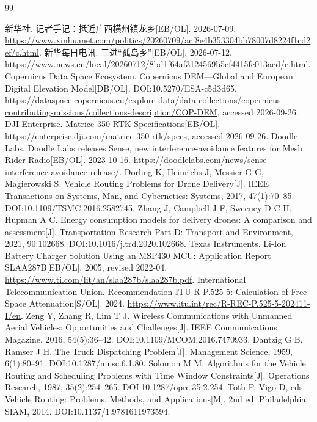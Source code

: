 \begin{thebibliography}{99}
\raggedright
{} 新华社. 记者手记：抵近广西横州镇龙乡[EB/OL]. 2026-07-09. \url{https://www.xinhuanet.com/politics/20260709/acf8e4b353304bb78007d8224f1cd2ef/c.html}.
 新华每日电讯. 三进“孤岛乡”[EB/OL]. 2026-07-12. \url{https://www.news.cn/local/20260712/8bd1f64af3124569b5cf4415fc013acd/c.html}.
 Copernicus Data Space Ecosystem. Copernicus DEM—Global and European Digital Elevation Model[DB/OL]. DOI:10.5270/ESA-c5d3d65. \url{https://dataspace.copernicus.eu/explore-data/data-collections/copernicus-contributing-missions/collections-description/COP-DEM}, accessed 2026-09-26.
 DJI Enterprise. Matrice 350 RTK Specifications[EB/OL]. \url{https://enterprise.dji.com/matrice-350-rtk/specs}, accessed 2026-09-26.
 Doodle Labs. Doodle Labs releases Sense, new interference-avoidance features for Mesh Rider Radio[EB/OL]. 2023-10-16. \url{https://doodlelabs.com/news/sense-interference-avoidance-release/}.
 Dorling K, Heinrichs J, Messier G G, Magierowski S. Vehicle Routing Problems for Drone Delivery[J]. IEEE Transactions on Systems, Man, and Cybernetics: Systems, 2017, 47(1):70--85. DOI:10.1109/TSMC.2016.2582745.
 Zhang J, Campbell J F, Sweeney D C II, Hupman A C. Energy consumption models for delivery drones: A comparison and assessment[J]. Transportation Research Part D: Transport and Environment, 2021, 90:102668. DOI:10.1016/j.trd.2020.102668.
 Texas Instruments. Li-Ion Battery Charger Solution Using an MSP430 MCU: Application Report SLAA287B[EB/OL]. 2005, revised 2022-04. \url{https://www.ti.com/lit/an/slaa287b/slaa287b.pdf}.
 International Telecommunication Union. Recommendation ITU-R P.525-5: Calculation of Free-Space Attenuation[S/OL]. 2024. \url{https://www.itu.int/rec/R-REC-P.525-5-202411-I/en}.
 Zeng Y, Zhang R, Lim T J. Wireless Communications with Unmanned Aerial Vehicles: Opportunities and Challenges[J]. IEEE Communications Magazine, 2016, 54(5):36--42. DOI:10.1109/MCOM.2016.7470933.
 Dantzig G B, Ramser J H. The Truck Dispatching Problem[J]. Management Science, 1959, 6(1):80--91. DOI:10.1287/mnsc.6.1.80.
 Solomon M M. Algorithms for the Vehicle Routing and Scheduling Problems with Time Window Constraints[J]. Operations Research, 1987, 35(2):254--265. DOI:10.1287/opre.35.2.254.
 Toth P, Vigo D, eds. Vehicle Routing: Problems, Methods, and Applications[M]. 2nd ed. Philadelphia: SIAM, 2014. DOI:10.1137/1.9781611973594.

\end{thebibliography}

